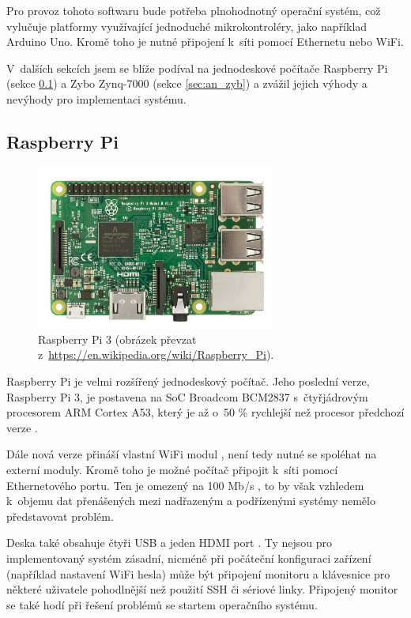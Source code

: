 Pro provoz tohoto softwaru bude potřeba plnohodnotný operační systém, což vylučuje platformy využívající jednoduché mikrokontroléry, jako například Arduino Uno. Kromě toho je nutné připojení k~síti pomocí Ethernetu nebo WiFi. 

V~dalších sekcích jsem se blíže podíval na jednodeskové počítače Raspberry Pi (sekce \ref{sec:an_rpi}) a Zybo Zynq-7000 (sekce \ref{sec:an_zyb}) a zvážil jejich výhody a nevýhody pro implementaci systému.

\subsection{Raspberry Pi}
\label{sec:an_rpi}

\begin{figure}[h!]
    \centering
    \includegraphics[width=0.7\textwidth]{images/rpi.jpg}
    \caption[Raspberry Pi 3]{Raspberry Pi 3 (obrázek převzat z~\url{https://en.wikipedia.org/wiki/Raspberry_Pi}).}
    \label{fig:rpi}
\end{figure}

Raspberry Pi je velmi rozšířený jednodeskový počítač. Jeho poslední verze, Raspberry Pi 3, je postavena na SoC Broadcom BCM2837 s~čtyřjádrovým procesorem ARM Cortex A53, který je až o~50 \% rychlejší než procesor předchozí verze \cite{rpi_benchoff}.

Dále nová verze přináší vlastní WiFi modul \cite{rpi_benchoff}, není tedy nutné se spoléhat na externí moduly. Kromě toho je možné počítač připojit k~síti pomocí Ethernetového portu. Ten je omezený na 100 Mb/s \cite{rpi_benchoff}, to by však vzhledem k~objemu dat přenášených mezi nadřazeným a podřízenými systémy nemělo představovat problém.

Deska také obsahuje čtyři USB a jeden HDMI port \cite{rpi_benchoff}. Ty nejsou pro implementovaný systém zásadní, nicméně při počáteční konfiguraci zařízení (například nastavení WiFi hesla) může být připojení monitoru a klávesnice pro některé uživatele pohodlnější než použití SSH či sériové linky. Připojený monitor se také hodí při řešení problémů se startem operačního systému.

